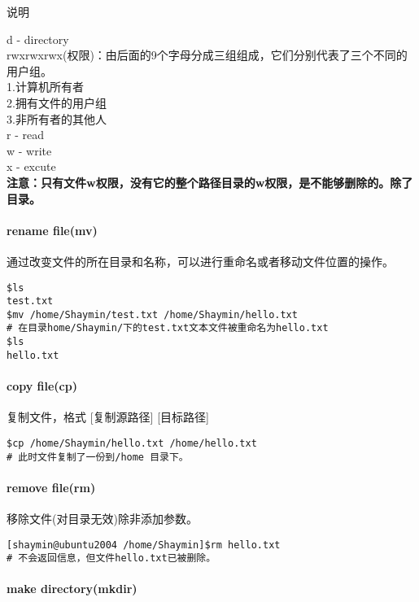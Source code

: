 \documentclass[
]{article}
\begin{document}
说明

d - directory\\
rwxrwxrwx(权限)：由后面的9个字母分成三组组成，它们分别代表了三个不同的用户组。\\
1.计算机所有者\\
2.拥有文件的用户组\\
3.非所有者的其他人\\
r - read\\
w - write\\
x - excute\\
\textbf{注意：只有文件w权限，没有它的整个路径目录的w权限，是不能够删除的。除了目录。}

\hypertarget{rename-filemv}{%
\paragraph{rename file(mv)}\label{rename-filemv}}

通过改变文件的所在目录和名称，可以进行重命名或者移动文件位置的操作。

\begin{verbatim}
$ls
test.txt
$mv /home/Shaymin/test.txt /home/Shaymin/hello.txt
# 在目录home/Shaymin/下的test.txt文本文件被重命名为hello.txt
$ls
hello.txt
\end{verbatim}

\hypertarget{copy-filecp}{%
\paragraph{copy file(cp)}\label{copy-filecp}}

复制文件，格式 {[}复制源路径{]} {[}目标路径{]}

\begin{verbatim}
$cp /home/Shaymin/hello.txt /home/hello.txt
# 此时文件复制了一份到/home 目录下。
\end{verbatim}

\hypertarget{remove-filerm}{%
\paragraph{remove file(rm)}\label{remove-filerm}}

移除文件(对目录无效)除非添加参数。

\begin{verbatim}
[shaymin@ubuntu2004 /home/Shaymin]$rm hello.txt
# 不会返回信息，但文件hello.txt已被删除。
\end{verbatim}

\hypertarget{make-directorymkdir}{%
\paragraph{make directory(mkdir)}\label{make-directorymkdir}}
\end{document}
